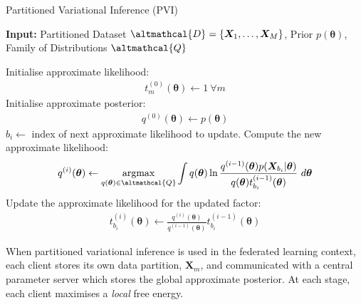 \begin{algorithm}
	\caption{Partitioned Variational Inference (PVI)}
	\label{alg:PVI}
	\hspace*{\algorithmicindent} \textbf{Input:} Partitioned Dataset $\altmathcal{D} = \lbrace \bm{X}_1, \ldots, \bm{X}_M \rbrace$, Prior $p(\bm{\theta})$, Family of Distributions $\altmathcal{Q}$
	\begin{algorithmic}[1] %
		\State Initialise approximate likelihood: \begin{align}
			t_m^{(0)}(\bm{\theta}) \leftarrow 1\ \forall m 
		\end{align} 
		\State Initialise approximate posterior:
		\begin{align}
		q^{(0)}(\bm{\theta}) \leftarrow p(\bm{\theta})
		\end{align} 
		\State $b_i \leftarrow $ index of next approximate likelihood to update. 
		\State Compute the new approximate likelihood:
		\begin{align}
		q^{(i)}(\bm{\theta}) \leftarrow  \mathop{\mathrm{argmax}}_{q(\bm{\theta}) \in \altmathcal{Q}} \int q(\bm{\theta}) \ln \frac{q^{(i-1)}(\bm{\theta}) p(\bm{X}_{b_i}|\bm{\theta})}{q(\bm{\theta}) t_{b_i}^{(i-1)}(\bm{\theta})}\ d\bm{\theta} \label{eq:local_free_energy_optimisation}
		\end{align}
		\State Update the approximate likelihood for the updated factor:
		\begin{align}
		t_{b_i}^{(i)}(\bm{\theta}) \leftarrow \frac{q^{(i)}(\bm{\theta})}{q^{(i-1)}(\bm{\theta})} t_{b_i}^{(i-1)}(\bm{\theta}) \label{eq:update_likelihood}
		\end{align}
		\EndFor
	\end{algorithmic}
\end{algorithm}

When partitioned variational inference is used in the federated learning context, each client stores its own data partition, $\bm{X}_m$, and communicated with a central parameter server which stores the global approximate posterior. At each stage, each client maximises a \emph{local} free energy. \cite{PVI} 

